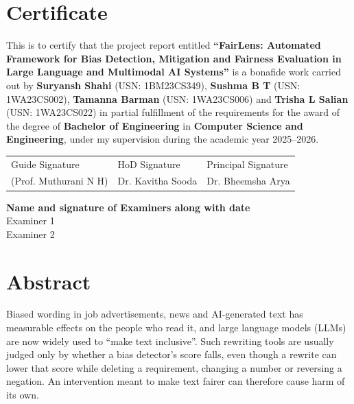 \documentclass[12pt,a4paper,oneside]{report}
\newcommand{\ProjectTitle}{FairLens: Automated Framework for Bias Detection, Mitigation and Fairness Evaluation in Large Language and Multimodal AI Systems}
\newcommand{\GuideName}{Prof. Muthurani N H}
\newcommand{\HoDName}{Dr. Kavitha Sooda}
\newcommand{\PrincipalName}{Dr. Bheemsha Arya}
\newcommand{\AcademicYear}{2025--2026}
\begin{document}
\chapter*{Certificate}
This is to certify that the project report entitled \textbf{``\ProjectTitle''} is a bonafide work carried out by
\textbf{Suryansh Shahi} (USN: 1BM23CS349), \textbf{Sushma B T} (USN: 1WA23CS002),
\textbf{Tamanna Barman} (USN: 1WA23CS006) and \textbf{Trisha L Salian} (USN: 1WA23CS022) in partial fulfillment of the
requirements for the award of the degree of \textbf{Bachelor of Engineering} in \textbf{Computer Science and Engineering},
under my supervision during the academic year \AcademicYear.

\vspace{2.5cm}
\noindent
\begin{tabularx}{\textwidth}{YYY}
Guide Signature & HoD Signature & Principal Signature\\
(\GuideName) & \HoDName & \PrincipalName\\
\end{tabularx}

\vspace{2cm}
\noindent\textbf{Name and signature of Examiners along with date}\\[1cm]
Examiner 1\\[1cm]
Examiner 2

\chapter*{Abstract}
Biased wording in job advertisements, news and AI-generated text has measurable effects on the people who read it, and
large language models (LLMs) are now widely used to ``make text inclusive''. Such rewriting tools are usually judged only
by whether a bias detector's score falls, even though a rewrite can lower that score while deleting a requirement,
changing a number or reversing a negation. An intervention meant to make text fairer can therefore cause harm of its own.
\end{document}
